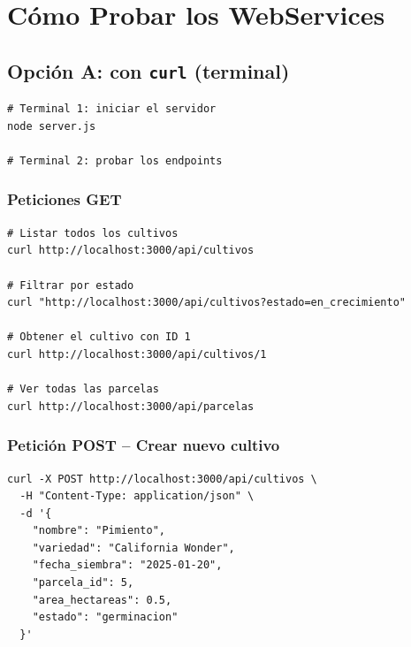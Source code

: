 \documentclass[12pt, a4paper]{article}
\begin{document}
\section{Cómo Probar los WebServices}

\subsection{Opción A: con \texttt{curl} (terminal)}

\begin{tcolorbox}[pasoStyle, title={\faTerminal\ Paso 3: Iniciar el servidor y probar}]
\begin{lstlisting}[style=bashStyle]
# Terminal 1: iniciar el servidor
node server.js

# Terminal 2: probar los endpoints
\end{lstlisting}
\end{tcolorbox}

\subsubsection{Peticiones GET}

\begin{tcolorbox}[codigoBox]
\begin{lstlisting}[style=bashStyle]
# Listar todos los cultivos
curl http://localhost:3000/api/cultivos

# Filtrar por estado
curl "http://localhost:3000/api/cultivos?estado=en_crecimiento"

# Obtener el cultivo con ID 1
curl http://localhost:3000/api/cultivos/1

# Ver todas las parcelas
curl http://localhost:3000/api/parcelas
\end{lstlisting}
\end{tcolorbox}

\subsubsection{Petición POST -- Crear nuevo cultivo}

\begin{tcolorbox}[codigoBox]
\begin{lstlisting}[style=bashStyle]
curl -X POST http://localhost:3000/api/cultivos \
  -H "Content-Type: application/json" \
  -d '{
    "nombre": "Pimiento",
    "variedad": "California Wonder",
    "fecha_siembra": "2025-01-20",
    "parcela_id": 5,
    "area_hectareas": 0.5,
    "estado": "germinacion"
  }'
\end{lstlisting}
\end{tcolorbox}
\end{document}
